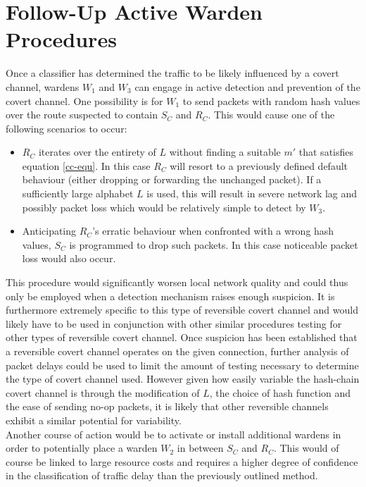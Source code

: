 \documentclass[12pt,a4paper,automark, toc=bib]{scrreprt}
\theoremstyle{definition}
\begin{document}
		\section{Follow-Up Active Warden Procedures}
		
			Once a classifier has determined the traffic to be likely influenced by a covert channel, wardens $W_1$ and $W_3$ can engage in active detection and prevention of the covert channel. One possibility is for $W_1$ to send packets with random hash values over the route suspected to contain $S_C$ and $R_C$. This would cause one of the following scenarios to occur:
			\begin{itemize}
				\item $R_C$ iterates over the entirety of $L$ without finding a suitable $m'$ that satisfies equation \ref{cc-equ}.  In this case $R_C$ will resort to a previously defined default behaviour (either dropping or forwarding the unchanged packet). If a sufficiently large alphabet $L$ is used, this will result in severe network lag and possibly packet loss which would be relatively simple to detect by $W_3$.
				\item Anticipating $R_C$'s erratic behaviour when confronted with a wrong hash values, $S_C$ is programmed to drop such packets. In this case noticeable packet loss would also occur. 
			\end{itemize}  
			This procedure would significantly worsen local network quality and could thus only be employed when a detection mechanism raises enough suspicion. It is furthermore extremely specific to this type of reversible covert channel and would likely have to be used in conjunction with other similar procedures testing for other types of reversible covert channel. Once suspicion has been established that a reversible covert channel operates on the given connection, further analysis of packet delays could be used to limit the amount of testing necessary to determine the type of covert channel used. However given how easily variable the hash-chain covert channel is through the modification of $L$, the choice of hash function and the ease of sending no-op packets, it is likely that other reversible channels exhibit a similar potential for variability. \\
			Another course of action would be to activate or install additional wardens in order to potentially place a warden $W_2$ in between $S_C$ and $R_C$. This would of course be linked to large resource costs and requires a higher degree of confidence in the classification of traffic delay than the previously outlined method.
		
\end{document}
